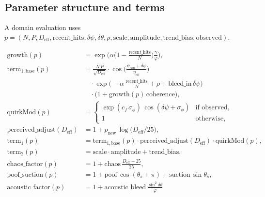 \documentclass[11pt,a4paper]{article}
\begin{document}
\subsection{Parameter structure and terms}

A domain evaluation uses
$p=(N,P,D_{\mathrm{eff}},\mathrm{recent\_hits},\delta\psi,\delta\theta,
\rho,\mathrm{scale},\mathrm{amplitude},\mathrm{trend\_bias},\mathrm{observed})$.

\begin{align}
\mathrm{growth}(p)
  &= \exp\!\Biggl(
       \alpha
       \Biggl(1-\frac{\mathrm{recent\_hits}}{N}\Biggr)
       \frac{\gamma}{\varphi}
     \Biggr),
\label{eq:growth}\\[0.45em]
\mathrm{term}_{1,\mathrm{base}}(p)
  &= \frac{N\,P}{\sqrt{D_{\mathrm{eff}}}}
     \cdot
     \cos\!\Biggl(
       \frac{\psi_{\mathrm{con}}+\delta\psi}{\eta_{\mathrm{eff}}}
     \Biggr)
     \nonumber\\
  &\quad\cdot
     \exp\!\Biggl(
       -\alpha\,\frac{\mathrm{recent\_hits}}{N}
       +\rho
       +\mathrm{bleed\_in}\,\delta\psi
     \Biggr)
     \nonumber\\
  &\quad\cdot
     \bigl(1+\mathrm{growth}(p)\,\mathrm{coherence}\bigr),
\label{eq:t1base}\\[0.45em]
\mathrm{quirkMod}(p)
  &= \begin{cases}
       \exp(c_f\,\sigma_\phi)\,\cos(\delta\psi+\sigma_\phi)
         & \text{if observed},\\[0.25em]
       1 & \text{otherwise},
     \end{cases}
\label{eq:quirk}\\[0.35em]
\mathrm{perceived\_adjust}(D_{\mathrm{eff}})
  &= 1+p_{\mathrm{new}}\,\log\!\bigl(D_{\mathrm{eff}}/25\bigr),
\label{eq:padj}\\[0.35em]
\mathrm{term}_1(p)
  &= \mathrm{term}_{1,\mathrm{base}}(p)
     \cdot\mathrm{perceived\_adjust}(D_{\mathrm{eff}})
     \cdot\mathrm{quirkMod}(p),
\label{eq:t1}\\[0.35em]
\mathrm{term}_2(p)
  &= \mathrm{scale}\cdot\mathrm{amplitude}+\mathrm{trend\_bias},
\label{eq:t2}\\
\mathrm{chaos\_factor}(p)
  &= 1+\mathrm{chaos}\,\frac{D_{\mathrm{eff}}-25}{25},
\label{eq:chaosf}\\
\mathrm{poof\_suction}(p)
  &= 1+\mathrm{poof}\,\cos(\theta_s+\pi)
     +\mathrm{suction}\,\sin\theta_s,
\label{eq:poofsuction}\\
\mathrm{acoustic\_factor}(p)
  &= 1
     +\mathrm{acoustic\_bleed}\,\frac{\sin^2\delta\theta}{\varphi}

\end{align}
\end{document}
